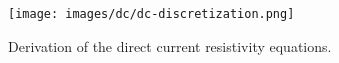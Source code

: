 \begin{figure}[ht]
    \centering
    \texttt{[image: images/dc/dc-discretization.png]}
    \caption{Derivation of the direct current resistivity equations.}
    \label{fig:dc-discretization}
\end{figure}
